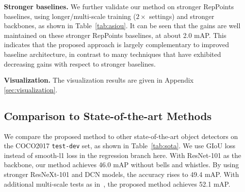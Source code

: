 \documentclass{article}
\begin{document}
\textbf{Stronger baselines.} We further validate our method on stronger RepPoints baselines, using longer/multi-scale training ($2\times$ settings) and stronger backbones, as shown in Table~\ref{tab:asiou}. It can be seen that the gains are well maintained on these stronger RepPoints baselines, at about 2.0 mAP. This indicates that the proposed approach is largely complementary to improved baseline architecture, in contrast to many techniques that have exhibited decreasing gains with respect to stronger baselines.

\textbf{Visualization.} The visualization results are given in Appendix \ref{sec:visualization}.

\subsection{Comparison to State-of-the-art Methods}
We compare the proposed method to other state-of-the-art object detectors on the COCO2017 \texttt{test-dev} set, as shown in Table~\ref{tab:sota}. We use GIoU \cite{2019giou} loss instead of smooth-l1 loss in the regression branch here.
With ResNet-101 as the backbone, our method achieves 46.0 mAP without bells and whistles. By using stronger ResNeXt-101 \cite{xie17resnext} and DCN \cite{DCN} models, the accuracy rises to 49.4 mAP. With additional multi-scale tests as in~\cite{zhang2019atss}, the proposed method achieves 52.1 mAP.
\end{document}
